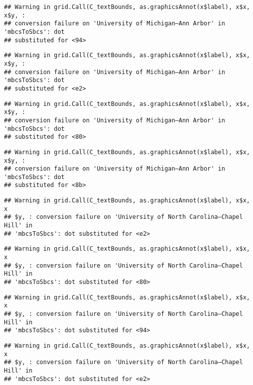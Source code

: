 \documentclass[]{article}
\begin{document}
\begin{verbatim}
## Warning in grid.Call(C_textBounds, as.graphicsAnnot(x$label), x$x, x$y, :
## conversion failure on 'University of Michigan—​Ann Arbor' in 'mbcsToSbcs': dot
## substituted for <94>
\end{verbatim}

\begin{verbatim}
## Warning in grid.Call(C_textBounds, as.graphicsAnnot(x$label), x$x, x$y, :
## conversion failure on 'University of Michigan—​Ann Arbor' in 'mbcsToSbcs': dot
## substituted for <e2>
\end{verbatim}

\begin{verbatim}
## Warning in grid.Call(C_textBounds, as.graphicsAnnot(x$label), x$x, x$y, :
## conversion failure on 'University of Michigan—​Ann Arbor' in 'mbcsToSbcs': dot
## substituted for <80>
\end{verbatim}

\begin{verbatim}
## Warning in grid.Call(C_textBounds, as.graphicsAnnot(x$label), x$x, x$y, :
## conversion failure on 'University of Michigan—​Ann Arbor' in 'mbcsToSbcs': dot
## substituted for <8b>
\end{verbatim}

\begin{verbatim}
## Warning in grid.Call(C_textBounds, as.graphicsAnnot(x$label), x$x, x
## $y, : conversion failure on 'University of North Carolina—​Chapel Hill' in
## 'mbcsToSbcs': dot substituted for <e2>
\end{verbatim}

\begin{verbatim}
## Warning in grid.Call(C_textBounds, as.graphicsAnnot(x$label), x$x, x
## $y, : conversion failure on 'University of North Carolina—​Chapel Hill' in
## 'mbcsToSbcs': dot substituted for <80>
\end{verbatim}

\begin{verbatim}
## Warning in grid.Call(C_textBounds, as.graphicsAnnot(x$label), x$x, x
## $y, : conversion failure on 'University of North Carolina—​Chapel Hill' in
## 'mbcsToSbcs': dot substituted for <94>
\end{verbatim}

\begin{verbatim}
## Warning in grid.Call(C_textBounds, as.graphicsAnnot(x$label), x$x, x
## $y, : conversion failure on 'University of North Carolina—​Chapel Hill' in
## 'mbcsToSbcs': dot substituted for <e2>
\end{verbatim}
\end{document}
